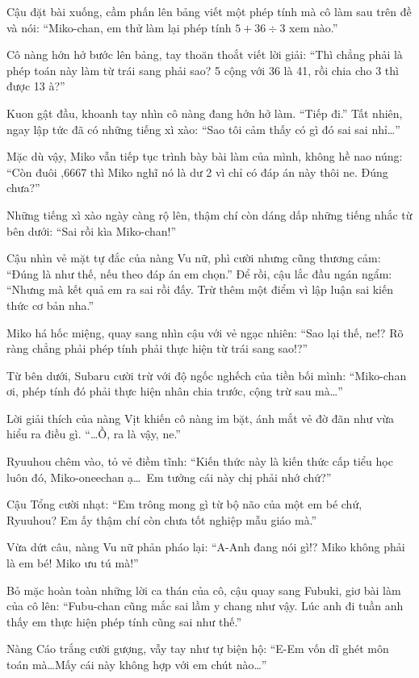 \documentclass[../main.tex]{subfiles}
\begin{document}
Cậu đặt bài xuống, cầm phấn lên bảng viết một phép tính mà cô làm sau trên đề và nói: ``Miko-chan, em thử làm lại phép tính \(5 + 36 \div 3\) xem nào.''

Cô nàng hớn hở bước lên bảng, tay thoăn thoắt viết lời giải: ``Thì chẳng phải là phép toán này làm từ trái sang phải sao? 5 cộng với 36 là 41, rồi chia cho 3 thì được 13 à?''

Kuon gật đầu, khoanh tay nhìn cô nàng đang hớn hở làm. ``Tiếp đi.'' Tất nhiên, ngay lập tức đã có những tiếng xì xào: ``Sao tôi cảm thấy có gì đó sai sai nhỉ\dots''

Mặc dù vậy, Miko vẫn tiếp tục trình bày bài làm của mình, không hề nao núng: ``Còn đuôi ,6667 thì Miko nghĩ nó là dư 2 vì chỉ có đáp án này thôi ne. Đúng chưa?''

Những tiếng xì xào ngày càng rộ lên, thậm chí còn dáng dấp những tiếng nhắc từ bên dưới: ``Sai rồi kìa Miko-chan!''

Cậu nhìn vẻ mặt tự đắc của nàng Vu nữ, phì cười nhưng cũng thương cảm: ``Đúng là như thế, nếu theo đáp án em chọn.'' Để rồi, cậu lắc đầu ngán ngẩm: ``Nhưng mà kết quả em ra sai rồi đấy. Trừ thêm một điểm vì lập luận sai kiến thức cơ bản nha.''

Miko há hốc miệng, quay sang nhìn cậu với vẻ ngạc nhiên: ``Sao lại thế, ne!? Rõ ràng chẳng phải phép tính phải thực hiện từ trái sang sao!?''

Từ bên dưới, Subaru cười trừ với độ ngốc nghếch của tiền bối mình: ``Miko-chan ơi, phép tính đó phải thực hiện nhân chia trước, cộng trừ sau mà\dots''

Lời giải thích của nàng Vịt khiến cô nàng im bặt, ánh mắt vẻ đờ đãn như vừa hiểu ra điều gì. ``\dots Ồ, ra là vậy, ne.''

Ryuuhou chêm vào, tỏ vẻ điềm tĩnh: ``Kiến thức này là kiến thức cấp tiểu học luôn đó, Miko-oneechan ạ\dots\ Em tưởng cái này chị phải nhớ chứ?''

Cậu Tổng cười nhạt: ``Em trông mong gì từ bộ não của một em bé chứ, Ryuuhou? Em ấy thậm chí còn chưa tốt nghiệp mẫu giáo mà.''

Vừa dứt câu, nàng Vu nữ phản pháo lại: ``A-Anh đang nói gì!? Miko không phải là em bé! Miko ưu tú mà!''

Bỏ mặc hoàn toàn những lời ca thán của cô, cậu quay sang Fubuki, giơ bài làm của cô lên: ``Fubu-chan cũng mắc sai lầm y chang như vậy. Lúc anh đi tuần anh thấy em thực hiện phép tính cũng sai như thế.''

Nàng Cáo trắng cười gượng, vẫy tay như tự biện hộ: ``E-Em vốn dĩ ghét môn toán mà\dots Mấy cái này không hợp với em chút nào\dots''
\end{document}
